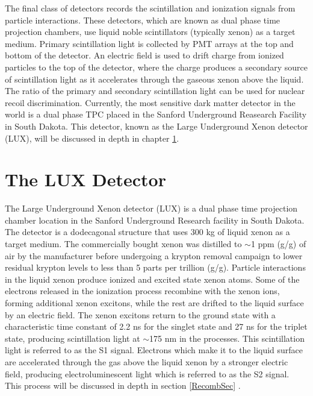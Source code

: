 \documentclass[a4paper,12pt]{article}
\begin{document}
The final class of detectors records the scintillation and ionization signals from particle interactions.  These detectors, which are known as dual phase time projection chambers, use liquid noble scintillators (typically xenon) as a target medium. Primary scintillation light is collected by PMT arrays at the top and bottom of the detector. An electric field is used to drift charge from ionized particles to the top of the detector, where the charge produces a secondary source of scintillation light as it accelerates through the gaseous xenon above the liquid.  The ratio of the primary and secondary scintillation light can be used for nuclear recoil discrimination.  Currently, the most sensitive dark matter detector in the world is a dual phase TPC placed in the Sanford Underground Reasearch Facility in South Dakota.  This detector, known as the Large Underground Xenon detector (LUX), will be discussed in depth in chapter \ref{LUXChap}.

\newpage


\section{The LUX Detector} \label{LUXChap} %
The Large Underground Xenon detector (LUX) is a dual phase time projection chamber location in the Sanford Underground Research facility in South Dakota.  The detector is a dodecagonal structure that uses 300 kg of liquid xenon as a target medium.   The commercially bought xenon was distilled to $\sim$1 ppm (g/g) of air by the manufacturer before undergoing a krypton removal campaign to lower residual krypton levels to less than 5 parts per trillion (g/g).  Particle interactions in the liquid xenon produce ionized and excited state xenon atoms.   Some of the electrons released in the ionization process recombine with the xenon ions, forming additional xenon excitons, while the rest are drifted to the liquid surface by an electric field.   The xenon excitons return to the ground state with a characteristic time constant of 2.2 ns for the singlet state and 27 ns for the triplet state, producing scintillation light at $\sim$175 nm in the processes.  This scintillation light is referred to as the S1 signal.   Electrons which make it to the liquid surface are accelerated through the gas above the liquid xenon by a stronger electric field, producing electroluminescent light which is referred to as the S2 signal. This process will be discussed in depth in section \ref{RecombSec} .
\end{document}
